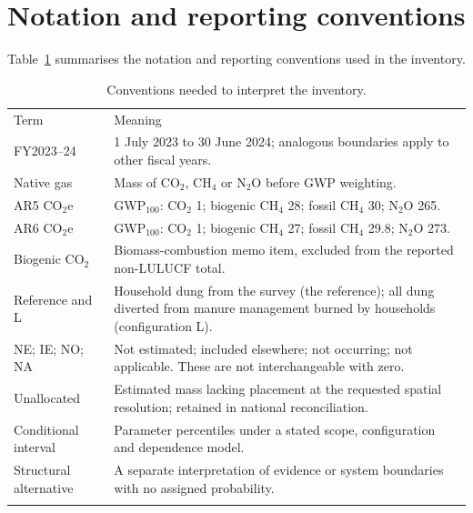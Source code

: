 \documentclass[essd]{copernicus}
\begin{document}
\appendix
\section{Notation and reporting conventions}
\label{app:notation}

Table~\ref{tab:notation} summarises the notation and reporting conventions used in the inventory.

\begin{table}[t]
\caption{Conventions needed to interpret the inventory.}
\label{tab:notation}
\small
\begin{tabular}{p{}p{}}
\tophline
Term & Meaning \\
\middlehline
FY2023--24 & 1 July 2023 to 30 June 2024; analogous boundaries apply to other fiscal years. \\
Native gas & Mass of CO$_2$, CH$_4$ or N$_2$O before GWP weighting. \\
AR5 CO$_2$e & GWP$_{100}$: CO$_2$ 1; biogenic CH$_4$ 28; fossil CH$_4$ 30; N$_2$O 265. \\
AR6 CO$_2$e & GWP$_{100}$: CO$_2$ 1; biogenic CH$_4$ 27; fossil CH$_4$ 29.8; N$_2$O 273. \\
Biogenic CO$_2$ & Biomass-combustion memo item, excluded from the reported non-LULUCF total. \\
Reference and L & Household dung from the survey (the reference); all dung diverted from manure management burned by households (configuration L). \\
NE; IE; NO; NA & Not estimated; included elsewhere; not occurring; not applicable. These are not interchangeable with zero. \\
Unallocated & Estimated mass lacking placement at the requested spatial resolution; retained in national reconciliation. \\
Conditional interval & Parameter percentiles under a stated scope, configuration and dependence model. \\
Structural alternative & A separate interpretation of evidence or system boundaries with no assigned probability. \\
\bottomhline
\end{tabular}
\end{table}

\noappendix
\end{document}
